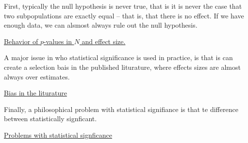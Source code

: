 First, typically the null hypothesis is never true, that is it is never the case that two subpopulations are exactly equal -- that is, that there is no effect. If we have enough data, we can alsmost always rule out the null hypothesis.  


\begin{exercise}
\href{https://colab.research.google.com/drive/1QarJhwPmSqCTQ-HwU_lXCUX6uvdhLdrM#scrollTo=f3odqYsslqkj&line=3&uniqifier=1}{Behavior of $p$-values in $N$ and effect size.  }
\end{exercise} 

A major issue in who statistical significance is used in practice, is that is can create a selection bais in the published liturature, where effects sizes are almost always over estimates. 
\begin{exercise}
\href{https://colab.research.google.com/drive/1QarJhwPmSqCTQ-HwU_lXCUX6uvdhLdrM#scrollTo=f3odqYsslqkj&line=3&uniqifier=1}{Bias in the liturature }
\end{exercise} 

Finally, a philosophical problem with statistical signifiance is that te difference between statistically signficant. 
\begin{exercise}
\href{https://colab.research.google.com/drive/1QarJhwPmSqCTQ-HwU_lXCUX6uvdhLdrM#scrollTo=f3odqYsslqkj&line=3&uniqifier=1}{Problems with statistical signficance }
\end{exercise} 






























